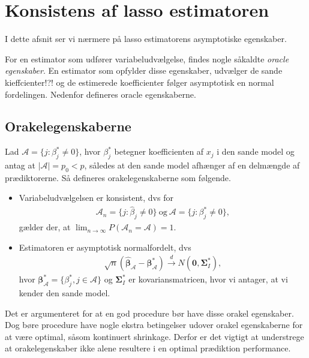 \section{Konsistens af lasso estimatoren}
I dette afsnit ser vi nærmere på lasso estimatorens asymptotiske egenskaber.

For en estimator som udfører variabeludvælgelse, findes nogle såkaldte \textit{oracle egenskaber}.
En estimator som opfylder disse egenskaber, udvælger de sande kieffcienter!?! og de estimerede koefficienter følger asymptotisk en normal fordelingen.
Nedenfor defineres oracle egenskaberne.

\subsection{Orakelegenskaberne} 
Lad $\mathcal{A} =\{j:\beta_j^* \neq 0\}$, hvor $\beta_j^*$ betegner koefficienten af $x_j$ i den sande model og antag at $\vert \mathcal{A} \vert=p_0 <p$, således at den sande model afhænger af en delmængde af prædiktorerne. 
Så defineres orakelegenskaberne som følgende. 
\begin{defn}[Orakelegenskaber]
\begin{itemize}
\item Variabeludvælgelsen er konsistent, dvs for
\begin{align*}
\mathcal{A}_n=\lbrace j :\hat{\beta}_j \neq 0 \rbrace \ \text{og} \ \mathcal{A} =\{j:\beta_j^* \neq 0\},
\end{align*}
gælder der, at $\lim_{n \rightarrow \infty }P(\mathcal{A}_n=\mathcal{A})=1$.
\item Estimatoren er asymptotisk normalfordelt, dvs
\begin{align*}
\sqrt{n}(\hat{\boldsymbol{\beta}}_\mathcal{A}-\boldsymbol{\beta}^*_\mathcal{A}) \overset{d}{\rightarrow} N(\mathbf{0}, \boldsymbol{\Sigma}^*_I),
\end{align*}
hvor $\boldsymbol{\beta}^*_\mathcal{A}=\{ \beta_j^*, j \in \mathcal{A} \}$ og $\boldsymbol{\Sigma}^*_I$ er kovariansmatricen, hvor vi antager, at vi kender den sande model.
\end{itemize}
\end{defn}
Det er argumenteret for at en god procedure bør have disse orakel egenskaber.
Dog børe procedure have nogle ekstra betingelser udover orakel egenskaberne for at være optimal, såsom kontinuert shrinkage.
Derfor er det vigtigt at understrege at orakelegenskaber ikke alene resultere i en optimal prædiktion performance.

